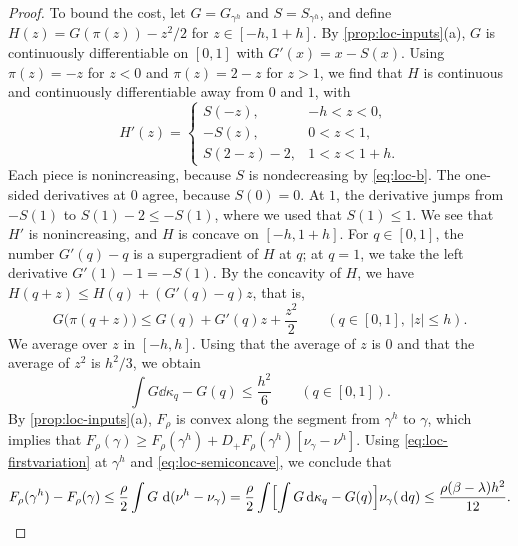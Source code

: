 \begin{proof}
To bound the cost, let $G=G_{\gamma^h}$ and $S=S_{\gamma^h}$, and define
$H(z)=G(\pi(z))-z^2/2$ for $z\in[-h,1+h]$. By \cref{prop:loc-inputs}(a), $G$
is continuously differentiable on $[0,1]$ with $G'(x)=x-S(x)$. Using
$\pi(z)=-z$ for $z<0$ and $\pi(z)=2-z$ for $z>1$, we find that $H$ is
continuous and continuously differentiable away from $0$ and $1$, with
\[
 H'(z)=
 \begin{cases}
 S(-z),&-h<z<0,\\
 -S(z),&0<z<1,\\
 S(2-z)-2,&1<z<1+h.
 \end{cases}
\]
Each piece is nonincreasing, because $S$ is nondecreasing by
\eqref{eq:loc-b}. The one-sided derivatives at $0$ agree, because $S(0)=0$. At
$1$, the derivative jumps from $-S(1)$ to $S(1)-2\le-S(1)$, where we used that
$S(1)\le1$. We see that $H'$ is nonincreasing, and $H$ is concave on
$[-h,1+h]$. For
$q\in[0,1]$, the number $G'(q)-q$ is a supergradient of $H$ at $q$; at $q=1$,
we take the left derivative $G'(1)-1=-S(1)$. By the concavity of $H$, we have
$H(q+z)\le H(q)+(G'(q)-q)z$, that is,
\[
 G\bigl(\pi(q+z)\bigr)\le G(q)+G'(q)z+\frac{z^2}2
 \qquad(q\in[0,1],\ |z|\le h).
\]
We average over $z$ in $[-h,h]$. Using that the average of $z$ is $0$ and
that the average of $z^2$ is $h^2/3$, we obtain
\begin{equation}\label{eq:loc-semiconcave}
 \int G\dd\kappa_q-G(q)\le\frac{h^2}6\qquad(q\in[0,1]).
\end{equation}
By \cref{prop:loc-inputs}(a), $F_\rho$ is convex along the segment from
$\gamma^h$ to $\gamma$, which implies that $F_\rho(\gamma)\ge
F_\rho(\gamma^h)+D_+F_\rho(\gamma^h)[\nu_\gamma-\nu^h]$. Using
\eqref{eq:loc-firstvariation} at $\gamma^h$ and \eqref{eq:loc-semiconcave}, we
conclude that
\[
 F_\rho(\gamma^h)-F_\rho(\gamma)
 \le\frac\rho2\int G\,\,\mathrm d(\nu^h-\nu_\gamma)
 =\frac\rho2\int\Bigl[\int G\,\mathrm d\kappa_q-G(q)\Bigr]\nu_\gamma(\,\mathrm d q)
 \le\frac{\rho(\beta-\lambda)h^2}{12}. \qedhere
\]
\end{proof}

